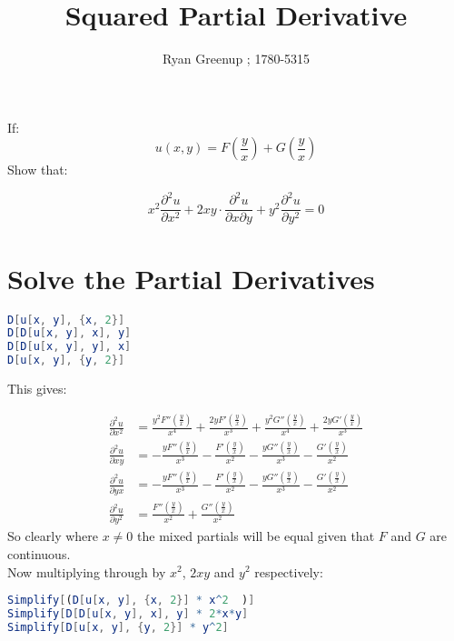 \documentclass[class=article, crop=false]{standalone}
\title{\color{coltit} \Huge Squared Partial Derivative}
\author{Ryan Greenup ; 1780-5315}
\begin{document}
\maketitle
\tableofcontents

If:
$$
u\left( x,y \right)= F\left( \frac{y}{x} \right)+ G\left( \frac{y}{x} \right)
$$
Show that:

$$
x^2 \frac{\partial^2 u }{\partial x^2 } +  2xy \cdot  \frac{\partial^2 u }{\partial x \partial y} +  y^2 \frac{\partial^2 u }{\partial y^2} = 0
$$

\section{Solve the Partial Derivatives}

\begin{lstlisting}[language = Mathematica]
D[u[x, y], {x, 2}]
D[D[u[x, y], x], y]
D[D[u[x, y], y], x]
D[u[x, y], {y, 2}]
\end{lstlisting}	

This gives:

$$
\begin{aligned}
  \frac{\partial^2 u }{\partial x^2} &= \frac{y^2 F''\left(\frac{y}{x}\right)}{x^4}+\frac{2 y F'\left(\frac{y}{x}\right)}{x^3}+\frac{y^2 G''\left(\frac{y}{x}\right)}{x^4}+\frac{2 y G'\left(\frac{y}{x}\right)}{x^3} \\
  \frac{\partial^2 u }{\partial xy} &= -\frac{y F''\left(\frac{y}{x}\right)}{x^3}-\frac{F'\left(\frac{y}{x}\right)}{x^2}-\frac{y G''\left(\frac{y}{x}\right)}{x^3}-\frac{G'\left(\frac{y}{x}\right)}{x^2}\\
  \frac{\partial^2 u }{\partial yx}&= -\frac{y F''\left(\frac{y}{x}\right)}{x^3}-\frac{F'\left(\frac{y}{x}\right)}{x^2}-\frac{y G''\left(\frac{y}{x}\right)}{x^3}-\frac{G'\left(\frac{y}{x}\right)}{x^2} \\
  \frac{\partial^2 u }{\partial y^2} &=  \frac{F''\left(\frac{y}{x}\right)}{x^2}+\frac{G''\left(\frac{y}{x}\right)}{x^2}
\end{aligned}
$$
So clearly where $x \neq 0$ the mixed partials will be equal given that $F$ and $G$ are continuous. \\

Now multiplying through by $x^2$, $2xy$ and $y^2$ respectively:

\begin{lstlisting}[language = Mathematica]
Simplify[(D[u[x, y], {x, 2}] * x^2  )]
Simplify[D[D[u[x, y], x], y] * 2*x*y]
Simplify[D[u[x, y], {y, 2}] * y^2]
\end{lstlisting}	
\end{document}
